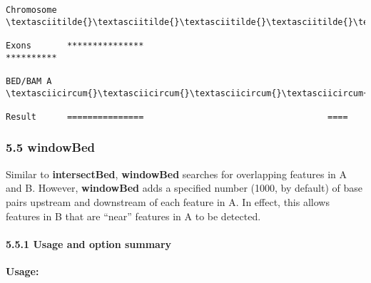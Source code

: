 \documentclass[letterpaper,10pt,english]{sphinxmanual}
\begin{document}
\begin{Verbatim}[commandchars=\\\{\}]
Chromosome  \textasciitilde{}\textasciitilde{}\textasciitilde{}\textasciitilde{}\textasciitilde{}\textasciitilde{}\textasciitilde{}\textasciitilde{}\textasciitilde{}\textasciitilde{}\textasciitilde{}\textasciitilde{}\textasciitilde{}\textasciitilde{}\textasciitilde{}\textasciitilde{}\textasciitilde{}\textasciitilde{}\textasciitilde{}\textasciitilde{}\textasciitilde{}\textasciitilde{}\textasciitilde{}\textasciitilde{}\textasciitilde{}\textasciitilde{}\textasciitilde{}\textasciitilde{}\textasciitilde{}\textasciitilde{}\textasciitilde{}\textasciitilde{}\textasciitilde{}\textasciitilde{}\textasciitilde{}\textasciitilde{}\textasciitilde{}\textasciitilde{}\textasciitilde{}\textasciitilde{}\textasciitilde{}\textasciitilde{}\textasciitilde{}\textasciitilde{}\textasciitilde{}\textasciitilde{}\textasciitilde{}\textasciitilde{}\textasciitilde{}\textasciitilde{}\textasciitilde{}\textasciitilde{}\textasciitilde{}\textasciitilde{}\textasciitilde{}\textasciitilde{}\textasciitilde{}\textasciitilde{}\textasciitilde{}\textasciitilde{}\textasciitilde{}\textasciitilde{}\textasciitilde{}\textasciitilde{}

Exons       ***************                                    **********

BED/BAM A      \textasciicircum{}\textasciicircum{}\textasciicircum{}\textasciicircum{}\textasciicircum{}\textasciicircum{}\textasciicircum{}\textasciicircum{}\textasciicircum{}\textasciicircum{}\textasciicircum{}\textasciicircum{}....................................\textasciicircum{}\textasciicircum{}\textasciicircum{}\textasciicircum{}

Result      ===============                                    ====
\end{Verbatim}


\subsubsection{5.5 windowBed}
\label{content/windowBed:windowbed}\label{content/windowBed::doc}
Similar to \textbf{intersectBed}, \textbf{windowBed} searches for overlapping features in A and B. However,
\textbf{windowBed} adds a specified number (1000, by default) of base pairs upstream and downstream of
each feature in A. In effect, this allows features in B that are ``near'' features in A to be detected.


\paragraph{5.5.1 Usage and option summary}
\label{content/windowBed:usage-and-option-summary}
\textbf{Usage:}
\end{document}
